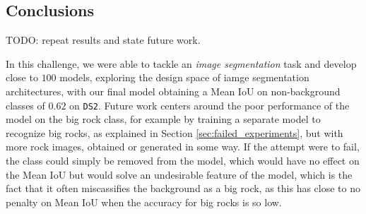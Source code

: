 \documentclass[11pt]{article}
\begin{document}
\begin{multicols}{2}
      \section{Conclusions}

      TODO: repeat results and state future work.

      In this challenge, we were able to tackle an \textit{image segmentation} task and develop close to $100$ models, exploring the design space of iamge segmentation architectures, with our final model obtaining a Mean IoU on non-background classes of $0.62$ on \texttt{DS2}. Future work centers around the poor performance of the model on the big rock class, for example by training a separate model to recognize big rocks, as explained in Section \ref{sec:failed_experiments}, but with more rock images, obtained or generated in some way. If the attempt were to fail, the class could simply be removed from the model, which would have no effect on the Mean IoU but would solve an undesirable feature of the model, which is the fact that it often miscassifies the background as a big rock, as this has close to no penalty on Mean IoU when the accuracy for big rocks is so low.

      
      

\end{multicols}
\end{document}
